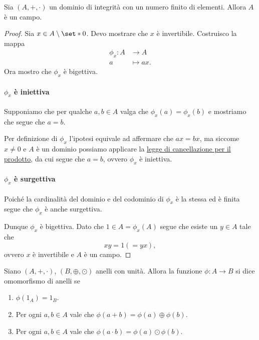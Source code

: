 \begin{proposition}
    Sia $(A, +, \cdot)$ un dominio di integrità con un numero finito di elementi. Allora $A$ è un campo.
\end{proposition}
\begin{proof}
    Sia $x \in A \setminus \set*{0}$. Devo mostrare che $x$ è invertibile.
    Costruisco la mappa \begin{align*}
        \phi_x : A &\to A\\
        a &\mapsto ax.
    \end{align*} Ora mostro che $\phi_x$ è bigettiva.

    \paragraph{$\phi_x$ è iniettiva} Supponiamo che per qualche $a, b \in A$ valga che $\phi_x(a) = \phi_x(b)$ e mostriamo che segue che $a = b$.

    Per definizione di $\phi_x$ l'ipotesi equivale ad affermare che $ax = bx$, ma siccome $x \neq 0$ e $A$ è un dominio possiamo applicare la \hyperref[cor:canc_prod_dominio]{legge di cancellazione per il prodotto}, da cui segue che $a = b$, ovvero $\phi_x$ è iniettiva.

    \paragraph{$\phi_x$ è surgettiva} Poiché la cardinalità del dominio e del codominio di $\phi_x$ è la stessa ed è finita segue che $\phi_x$ è anche surgettiva.

    Dunque $\phi_x$ è bigettiva. Dato che $1 \in A = \phi_x(A)$ segue che esiste un $y \in A$ tale che \[
        xy = 1 (= yx), 
    \] ovvero $x$ è invertibile e $A$ è un campo.
\end{proof}

\begin{definition}
     \label{def:omo_anelli}
    Siano $(A, +, \cdot)$, $(B, \oplus, \odot)$ anelli con unità. Allora la funzione $\phi : A \to B$ si dice omomorfismo di anelli se \begin{enumerate}[label={(\roman*)}]
        \item $\phi(1_A) = 1_B$.
        \item Per ogni $a, b \in A$ vale che $\phi(a + b) = \phi(a) \oplus \phi(b)$.
        \item Per ogni $a, b \in A$ vale che $\phi(a \cdot b) = \phi(a) \odot \phi(b)$.
    \end{enumerate}
\end{definition}